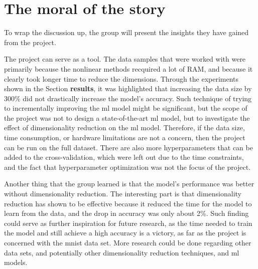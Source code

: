 \section{The moral of the story}\label{sec:moral-of-the-story}
To wrap the discussion up, the group will present the insights they have gained from the project. 



The project can serve as a tool. The data samples that were worked with were primarily because the nonlinear methods recquired a lot of RAM, and because it clearly took longer time to reduce the dimensions. Through the experiments shown in the Section \textbf{results}, it was highlighted that increasing the data size by 300\% did not drastically increase the model's accuracy. Such technique of trying to incrementally improving the \gls{ml} model might be significant, but the scope of the project was not to design a state-of-the-art \gls{ml} model, but to investigate the effect of dimensionality reduction on the \gls{ml} model. Therefore, if the data size, time consumption, or hardware limitations are not a concern, then the project can be run on the full dataset. There are also more hyperparameters that can be added to the cross-validation, which were left out due to the time constraints, and the fact that hyperparameter optimization was not the focus of the project.


Another thing that the group learned is that the model's performance was better without dimensionality reduction. The interesting part is that dimensionality reduction has shown to be effective because it reduced the time for the model to learn from the data, and the drop in accuracy was only about 2\%. Such finding could serve as further inspiration for future research, as the time needed to train the model and still achieve a high accuracy is a victory, as far as the project is concerned with the \gls{mnist} data set. More research could be done regarding other data sets, and potentially other dimensionality reduction techniques, and \gls{ml} models.




